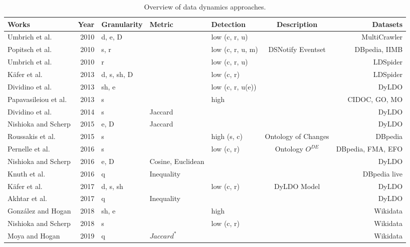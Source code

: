 \documentclass[sw]{iosart2x}
\begin{document}
\begin{table}[]
	\centering
	\caption{Overview of data dynamics approaches.}
	\label{tab:dyn}
	\begin{tabular}{lrlllcr}
		\hline
		Works & \multicolumn{1}{l}{Year} & Granularity & Metric  & Detection & Description  & Datasets \\ \hline
		Umbrich et al. \cite{UmbrichHHPD10} & 2010 & d, e, D &  & low (c, r, u)   &    & MultiCrawler \\
		Popitsch et al. \cite{PopitschHR10,PopitschH10,PopitschH11} & 2010 & s, r & & low (c, r, u, m) & DSNotify Eventset & DBpedia, IIMB\footnotemark \\
		Umbrich et al. \cite{UmbrichKL10} & 2010 & r &  & low (c, r, u)  & & LDSpider \\
		K{\"{a}}fer et al. \cite{KaferAUOH13} & 2013 & d, s, sh, D &  & low (c, r)   &  & LDSpider \\
		Dividino et al. \cite{DividinoSGG13} & 2013 & sh, e &  & low (c, r, u(e))  &   & DyLDO \\
		Papavasileiou et al. \cite{PapavasileiouFFKC13} & 2013 & s &  & high &    & CIDOC, GO, MO \\
		Dividino et al. \cite{DividinoGSG14} & 2014 & s & Jaccard &  &  & DyLDO \\
		Nishioka and Scherp \cite{NishiokaS15} & 2015 & e, D & Jaccard &  & & DyLDO \\
		Roussakis et al. \cite{RoussakisCSFS15,StefanidisFCR16} & 2015 & s &  & high (s, c) & Ontology of Changes  & DBpedia \\
		Pernelle et al. \cite{PernelleSMT16} & 2016 & s &  & low (c, r) & Ontology $O^{DE}$   & DBpedia, FMA, EFO \\
		Nishioka and Scherp \cite{NishiokaS16} & 2016 & e, D & Cosine, Euclidean &  &   & DyLDO \\  
		Knuth et al. \cite{KnuthHS16} & 2016 & q & Inequality &  &  & DBpedia live \\  
		K{\"{a}}fer et al. \cite{KaferWA17} & 2017 & d, s, sh &  & low (c, r)  & DyLDO  Model  & DyLDO \\
		Akhtar et al. \cite{AkhtarAL17} & 2017 & q & Inequality &  &   & DyLDO \\ 
		Gonz\'{a}lez and Hogan \cite{GonzalezH18} & 2018 & sh, e &  & high  &  & Wikidata \\
		Nishioka and Scherp \cite{NishiokaS18} & 2018 & s &  & low (c, r)  &  & Wikidata \\
		Moya and Hogan \cite{LoustaunauH19} & 2019 & q & $Jaccard^*$ &  &  & Wikidata \\
		\hline
	\end{tabular}%
\end{table}%
\end{document}
